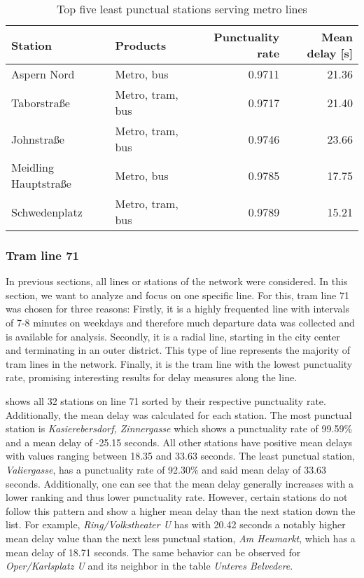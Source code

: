 \begin{table}
	\centering
	\begin{tabular}{llrr}
		\toprule
		Station & Products & Punctuality rate & Mean delay [s] \\
		\midrule
		Aspern Nord & Metro, bus & 0.9711 & 21.36 \\
		Taborstraße & Metro, tram, bus &  0.9717 & 21.40\\
		Johnstraße & Metro, tram, bus & 0.9746 & 23.66 \\
		Meidling Hauptstraße & Metro, bus & 0.9785 & 17.75 \\
		Schwedenplatz &  Metro, tram, bus & 0.9789 & 15.21 \\
		\bottomrule
	\end{tabular}
	\caption{Top five least punctual stations serving metro lines}
	\label{table:metro-stations-top5-least}
\end{table}

\subsubsection{Tram line 71}
\label{sec:line-71-analysis}

In previous sections, all lines or stations of the network were considered. In this section, we want to analyze and focus on one specific line. For this, tram line 71 was chosen for three reasons: Firstly, it is a highly frequented line with intervals of 7-8 minutes on weekdays and therefore much departure data was collected and is available for analysis. Secondly, it is a radial line, starting in the city center and terminating in an outer district. This type of line represents the majority of tram lines in the network. Finally, it is the tram line with the lowest punctuality rate, promising interesting results for delay measures along the line. 

 shows all 32 stations on line 71 sorted by their respective punctuality rate. Additionally, the mean delay was calculated for each station. The most punctual station is \textit{Kasierebersdorf, Zinnergasse} which shows a punctuality rate of 99.59\% and a mean delay of -25.15 seconds. All other stations have positive mean delays with values ranging between 18.35 and 33.63 seconds. The least punctual station, \textit{Valiergasse}, has a punctuality rate of 92.30\% and said mean delay of 33.63 seconds. Additionally, one can see that the mean delay generally increases with a lower ranking and thus lower punctuality rate. However, certain stations do not follow this pattern and show a higher mean delay than the next station down the list. For example, \textit{Ring/Volkstheater U} has with 20.42 seconds a notably higher mean delay value than the next less punctual station, \textit{Am Heumarkt}, which has a mean delay of 18.71 seconds. The same behavior can be observed for \textit{Oper/Karlsplatz U} and its neighbor in the table \textit{Unteres Belvedere}.

